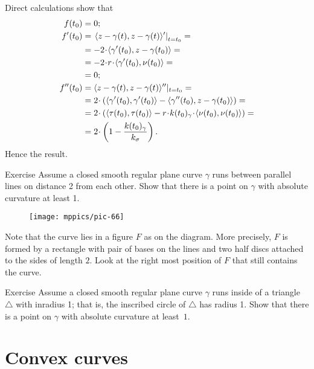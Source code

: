 Direct calculations show that
\begin{align*}
f(t_0)&=0;
\\
f'(t_0)&=\left.\langle z-\gamma(t),z-\gamma(t) \rangle'\right|_{t=t_0}=
\\
&=-2\cdot \langle \gamma'(t_0),z-\gamma(t_0) \rangle=
\\&=-2\cdot r\cdot \langle \gamma'(t_0),\nu(t_0) \rangle=
\\
&=0;
\\
f''(t_0)&=\langle z-\gamma(t),z-\gamma(t) \rangle''|_{t=t_0}=
\\
&=2\cdot\left( \langle \gamma'(t_0),\gamma'(t_0) \rangle-\langle \gamma''(t_0),z-\gamma(t_0) \rangle \right)=
\\
&=2\cdot\left( \langle \tau(t_0),\tau(t_0) \rangle-r\cdot\kur(t_0)_\gamma\cdot \langle \nu(t_0),\nu(t_0) \rangle \right)=
\\
&=2\cdot\left(1- \frac{\kur(t_0)_\gamma}{\kur_\sigma}\right).
\end{align*}
Hence the result.\qeds


\begin{thm}{Exercise}\label{ex:between-parallels}
Assume a closed smooth regular plane curve $\gamma$ runs between parallel lines on distance 2 from each other.
Show that there is a point on $\gamma$ with absolute curvature at least 1.
\end{thm}

\begin{wrapfigure}{r}{35 mm}
\vskip1mm
\centering
\texttt{[image: mppics/pic-66]}
\vskip0mm
\end{wrapfigure}

 Note that the curve lies in a figure $F$ as on the diagram.
More precisely, $F$ is formed by a rectangle with pair of bases on the lines and two half discs attached to the sides of length $2$.
Look at the right most position of $F$ that still contains the curve.

\begin{thm}{Exercise}\label{ex:in-triangle}
Assume a closed smooth regular plane curve $\gamma$ runs inside of a triangle $\triangle$ with inradius 1; that is, the inscribed circle of $\triangle$ has radius 1.
Show that there is a point on $\gamma$ with absolute curvature at least~$1$.
\end{thm}



\section*{Convex curves}


